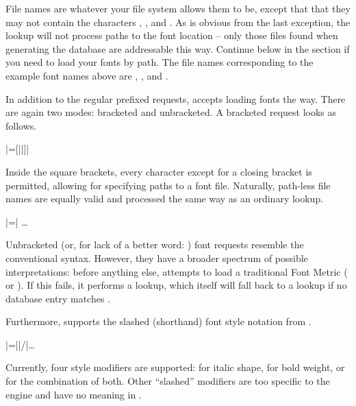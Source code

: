 File names are whatever your file system allows them to be, except
that that they may not contain the characters
  \inlinecode {(},
  \inlinecode {:}, and
  \inlinecode {/}.
%
As is obvious from the last exception, the  lookup will
not process paths to the font location -- only those
files found when generating the database are addressable this way.
%
Continue below in the \XETEX section if you need to load your fonts
by path.
%
The file names corresponding to the example font names above are
  ,
  , and
  .

\endsubsection


In addition to the regular prefixed requests, 
accepts loading fonts the \XETEX way.
%
There are again two modes: bracketed and unbracketed.
A bracketed request looks as follows.

\beginnarrower
  |\font\fontname=[||]|
\endnarrower

\noindent
Inside the square brackets, every character except for a closing
bracket is permitted, allowing for specifying paths to a font file.
%
Naturally, path-less file names are equally valid and processed the
same way as an ordinary  lookup.

\beginnarrower
  |\font\fontname=| \dots
\endnarrower

Unbracketed (or, for lack of a better word: )
font requests resemble the conventional \TEX syntax.
%
However, they have a broader spectrum of possible interpretations:
before anything else,  attempts to load a
traditional \TEX Font Metric ( or ).
%
If this fails, it performs a  lookup, which itself will
fall back to a  lookup if no database entry matches
.

Furthermore,  supports the slashed (shorthand)
font style notation from \XETEX.

\beginnarrower
  |\font\fontname=||/|\dots
\endnarrower

\noindent
Currently, four style modifiers are supported:
   for italic shape,
   for bold   weight,
   or  for the combination of both.
%
Other “slashed” modifiers are too specific to the \XETEX engine and
have no meaning in \LUATEX.

